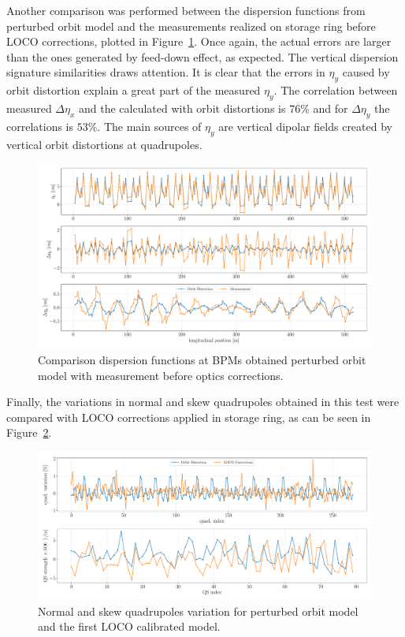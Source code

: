 Another comparison was performed between the dispersion functions from perturbed orbit model and the measurements realized on storage ring before LOCO corrections, plotted in Figure~\ref{fig:disperson_orb}. Once again, the actual errors are larger than the ones generated by feed-down effect, as expected. The vertical dispersion signature similarities draws attention. It is clear that the errors in $\eta_y$ caused by orbit distortion explain a great part of the measured $\eta_y$. The correlation between measured $\Delta\eta_x$ and the calculated with orbit distortions is $76\%$ and for $\Delta\eta_y$ the correlations is $53\%$. The main sources of $\eta_y$ are vertical dipolar fields created by vertical orbit distortions at quadrupoles.
\begin{figure}[h!]
\centering
\includegraphics[width=1.0\textwidth]{figures/dispersion_orbit_iter0.pdf}
\caption{Comparison dispersion functions at BPMs obtained perturbed orbit model with measurement before optics corrections.}
\label{fig:disperson_orb}
\end{figure}

Finally, the variations in normal and skew quadrupoles obtained in this test were compared with LOCO corrections applied in storage ring, as can be seen in Figure~\ref{fig:corrections_orb}.
\begin{figure}[h!]
\centering
\includegraphics[width=1.0\textwidth]{figures/corrections_orb_residue_loco_iter0.pdf}
\caption{Normal and skew quadrupoles variation for perturbed orbit model and the first LOCO calibrated model.}
\label{fig:corrections_orb}
\end{figure}

